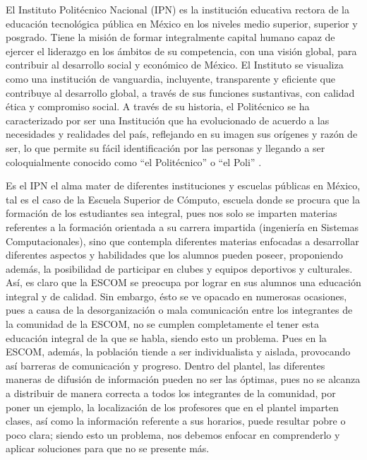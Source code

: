 \noindent
El Instituto Politécnico Nacional (IPN) es la institución educativa rectora de la educación tecnológica pública en México en los niveles medio superior, superior y posgrado. Tiene la misión de formar integralmente capital humano capaz de ejercer el liderazgo en los ámbitos de su competencia, con una visión global, para contribuir al desarrollo social y económico de México. 
El Instituto se visualiza como una institución de vanguardia, incluyente, transparente y eficiente que contribuye al desarrollo global, a través de sus funciones sustantivas, con calidad ética y compromiso social. 
A través de su historia, el Politécnico se ha caracterizado por ser una Institución que ha evolucionado de acuerdo a las necesidades y realidades del país, reflejando en su imagen sus orígenes y razón de ser, lo que permite su fácil identificación por las personas y llegando a ser coloquialmente conocido como “el Politécnico” o “el Poli” \cite{IPN}.  

\noindent
\newline
Es el IPN el alma mater de diferentes instituciones y escuelas públicas en México, tal es el caso de la Escuela Superior de Cómputo, escuela donde se procura que la formación de los estudiantes sea integral, pues nos solo se imparten materias referentes a la formación orientada a su carrera impartida (ingeniería en Sistemas Computacionales), sino que contempla diferentes materias enfocadas a desarrollar diferentes aspectos y habilidades que los alumnos pueden poseer, proponiendo además, la posibilidad de participar en clubes y equipos deportivos y culturales. Así, es claro que la ESCOM se preocupa por lograr en sus alumnos una educación integral y de calidad. Sin embargo, ésto se ve opacado en numerosas ocasiones, pues a causa de la desorganización o mala comunicación entre los integrantes de la comunidad de la ESCOM, no se cumplen completamente el tener esta educación integral de la que se habla, siendo esto un problema. Pues en la ESCOM, además, la población tiende a ser individualista y aislada, provocando así barreras de comunicación y progreso. Dentro del plantel, las diferentes maneras de difusión de información pueden no ser las óptimas, pues no se alcanza a distribuir de manera correcta a todos los integrantes de la comunidad, por poner un ejemplo, la localización de los profesores que en el plantel imparten clases, así como la información referente a sus horarios, puede resultar pobre o poco clara; siendo esto un problema, nos debemos enfocar en comprenderlo y aplicar soluciones para que no se presente más. 

